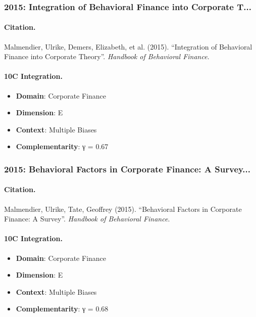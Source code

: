 \subsubsection{2015: Integration of Behavioral Finance into Corporate T...}

\paragraph{Citation.}
Malmendier, Ulrike, Demers, Elizabeth, et al. (2015). ``Integration of Behavioral Finance into Corporate Theory''. \textit{Handbook of Behavioral Finance}.

\paragraph{10C Integration.}
\begin{itemize}[nosep]
  \item \textbf{Domain}: Corporate Finance
  \item \textbf{Dimension}: E
  \item \textbf{Context}: Multiple Biases
  \item \textbf{Complementarity}: γ = 0.67
\end{itemize}


\subsubsection{2015: Behavioral Factors in Corporate Finance: A Survey...}

\paragraph{Citation.}
Malmendier, Ulrike, Tate, Geoffrey (2015). ``Behavioral Factors in Corporate Finance: A Survey''. \textit{Handbook of Behavioral Finance}.

\paragraph{10C Integration.}
\begin{itemize}[nosep]
  \item \textbf{Domain}: Corporate Finance
  \item \textbf{Dimension}: E
  \item \textbf{Context}: Multiple Biases
  \item \textbf{Complementarity}: γ = 0.68
\end{itemize}


